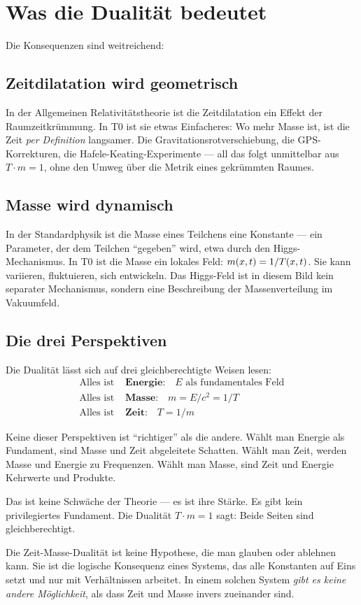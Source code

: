 \section{Was die Dualität bedeutet}

Die Konsequenzen sind weitreichend:

\subsection{Zeitdilatation wird geometrisch}

In der Allgemeinen Relativitätstheorie ist die Zeitdilatation ein Effekt der Raumzeitkrümmung. In T0 ist sie etwas Einfacheres: Wo mehr Masse ist, ist die Zeit \emph{per Definition} langsamer. Die Gravitationsrotverschiebung, die GPS-Korrekturen, die Hafele-Keating-Experimente --- all das folgt unmittelbar aus $T \cdot m = 1$, ohne den Umweg über die Metrik eines gekrümmten Raumes.

\subsection{Masse wird dynamisch}

In der Standardphysik ist die Masse eines Teilchens eine Konstante --- ein Parameter, der dem Teilchen \enquote{gegeben} wird, etwa durch den Higgs-Mechanismus. In T0 ist die Masse ein lokales Feld: $m(x,t) = 1/T(x,t)$. Sie kann variieren, fluktuieren, sich entwickeln. Das Higgs-Feld ist in diesem Bild kein separater Mechanismus, sondern eine Beschreibung der Massenverteilung im Vakuumfeld.

\subsection{Die drei Perspektiven}

Die Dualität lässt sich auf drei gleichberechtigte Weisen lesen:
\begin{align}
\text{Alles ist } &\textbf{Energie:} \quad E \text{ als fundamentales Feld} \\
\text{Alles ist } &\textbf{Masse:} \quad m = E/c^2 = 1/T \\
\text{Alles ist } &\textbf{Zeit:} \quad T = 1/m
\end{align}

Keine dieser Perspektiven ist \enquote{richtiger} als die andere. Wählt man Energie als Fundament, sind Masse und Zeit abgeleitete Schatten. Wählt man Zeit, werden Masse und Energie zu Frequenzen. Wählt man Masse, sind Zeit und Energie Kehrwerte und Produkte.

Das ist keine Schwäche der Theorie --- es ist ihre Stärke. Es gibt kein privilegiertes Fundament. Die Dualität $T \cdot m = 1$ sagt: Beide Seiten sind gleichberechtigt.

\begin{kerngedanke}
Die Zeit-Masse-Dualität ist keine Hypothese, die man glauben oder ablehnen kann. Sie ist die logische Konsequenz eines Systems, das alle Konstanten auf Eins setzt und nur mit Verhältnissen arbeitet. In einem solchen System \emph{gibt es keine andere Möglichkeit}, als dass Zeit und Masse invers zueinander sind.
\end{kerngedanke}
